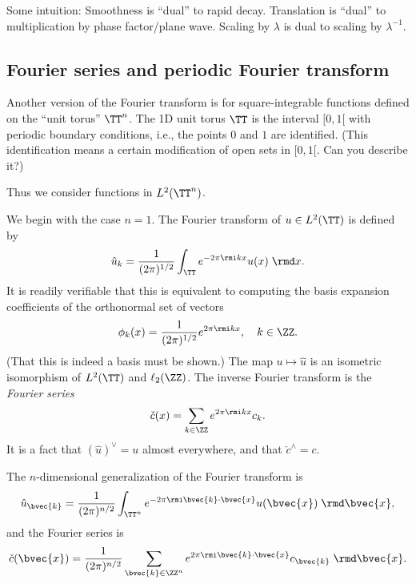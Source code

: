 Some intuition: Smoothness is ``dual'' to rapid decay. Translation is ``dual'' to multiplication by phase factor/plane wave. Scaling by $\lambda$ is dual to scaling by $\lambda^{-1}$.


\subsection{Fourier series and periodic Fourier transform}

Another version of the Fourier transform is for square-integrable functions defined on the ``unit torus'' $\TT^n$. The 1D unit torus $\TT$ is the interval $[0,1[$ with periodic boundary conditions, i.e., the points $0$ and $1$ are identified. (This identification means a certain modification of open sets in $[0,1[$. Can you describe it?)

Thus we consider functions in $L^2(\TT^n)$.

We begin with the case $n=1$. The Fourier transform  of $u \in L^2(\TT)$ is defined by
\begin{equation}
    \hat{u}_k = \frac{1}{(2\pi)^{1/2}} \int_{\TT} e^{-2\pi\rmi k x} u(x) \; \rmd x.
\end{equation}
It is readily verifiable that this is equivalent to computing the basis expansion coefficients of the orthonormal set of vectors 
\begin{equation}
    \phi_k (x) = \frac{1}{(2\pi)^{1/2}} e^{2\pi\rmi k x}, \quad k \in \ZZ.
\end{equation}
(That this is indeed a basis must be shown.)
The map $u \mapsto \hat{u}$ is an isometric isomorphism of $L^2(\TT)$ and $\ell_2(\ZZ)$.
The inverse Fourier transform is the \emph{Fourier series}
\begin{equation}
    \check{c}(x) = \sum_{k\in\ZZ} e^{2\pi \rmi k x} c_k.
\end{equation}
It is a fact that $(\hat{u})^\vee = u$ almost everywhere, and that $\check{c}^\wedge = c$.

The $n$-dimensional generalization of the Fourier transform is
\begin{equation}
    \hat{u}_{\bvec{k}} = \fconst \int_{\TT^n} e^{-2\pi \rmi \bvec{k}\cdot\bvec{x}} u(\bvec{x}) \; \rmd \bvec{x},
\end{equation}
and the Fourier series is
\begin{equation}
    \check{c}(\bvec{x}) = \fconst \sum_{\bvec{k}\in \ZZ^n} e^{2\pi 
    \rmi \bvec{k}\cdot\bvec{x}} c_{\bvec{k}} \; \rmd \bvec{x}.
\end{equation}

